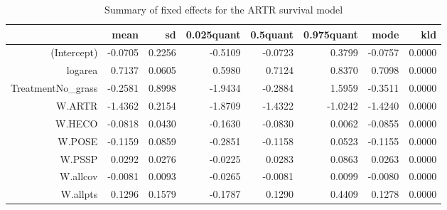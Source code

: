 \documentclass[11pt]{article}
\begin{document}
\begin{table}[ht]
\centering
\caption{Summary of fixed effects for the ARTR survival model} 
\label{ARTRsurvival}
\begin{tabular}{rrrrrrrr}
  \hline
 & mean & sd & 0.025quant & 0.5quant & 0.975quant & mode & kld \\ 
  \hline
(Intercept) & -0.0705 & 0.2256 & -0.5109 & -0.0723 & 0.3799 & -0.0757 & 0.0000 \\ 
  logarea & 0.7137 & 0.0605 & 0.5980 & 0.7124 & 0.8370 & 0.7098 & 0.0000 \\ 
  TreatmentNo\_grass & -0.2581 & 0.8998 & -1.9434 & -0.2884 & 1.5959 & -0.3511 & 0.0000 \\ 
  W.ARTR & -1.4362 & 0.2154 & -1.8709 & -1.4322 & -1.0242 & -1.4240 & 0.0000 \\ 
  W.HECO & -0.0818 & 0.0430 & -0.1630 & -0.0830 & 0.0062 & -0.0855 & 0.0000 \\ 
  W.POSE & -0.1159 & 0.0859 & -0.2851 & -0.1158 & 0.0523 & -0.1155 & 0.0000 \\ 
  W.PSSP & 0.0292 & 0.0276 & -0.0225 & 0.0283 & 0.0863 & 0.0263 & 0.0000 \\ 
  W.allcov & -0.0081 & 0.0093 & -0.0265 & -0.0081 & 0.0099 & -0.0080 & 0.0000 \\ 
  W.allpts & 0.1296 & 0.1579 & -0.1787 & 0.1290 & 0.4409 & 0.1278 & 0.0000 \\ 
   \hline
\end{tabular}
\end{table}
\end{document}
